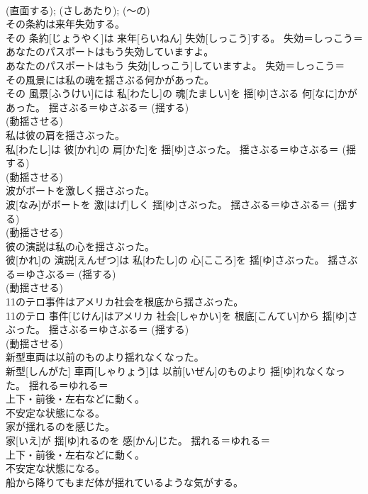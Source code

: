 \documentclass[8pt]{extreport}
\begin{document}
\begin{CJK}{UTF8}{min}
{\\	(直面する); (さしあたり); (〜の) 
\\	その条約は来年失効する。	
\\	その 条約[じょうやく]は 来年[らいねん] 失効[しっこう]する。	失効＝しっこう＝ 
\\	あなたのパスポートはもう失効していますよ。	
\\	あなたのパスポートはもう 失効[しっこう]していますよ。	失効＝しっこう＝ 
\\	その風景には私の魂を揺さぶる何かがあった。	
\\	その 風景[ふうけい]には 私[わたし]の 魂[たましい]を 揺[ゆ]さぶる 何[なに]かがあった。	揺さぶる＝ゆさぶる＝ (揺する) 
\\	(動揺させる) 
\\	私は彼の肩を揺さぶった。	
\\	私[わたし]は 彼[かれ]の 肩[かた]を 揺[ゆ]さぶった。	揺さぶる＝ゆさぶる＝ (揺する) 
\\	(動揺させる) 
\\	波がボートを激しく揺さぶった。	
\\	波[なみ]がボートを 激[はげ]しく 揺[ゆ]さぶった。	揺さぶる＝ゆさぶる＝ (揺する) 
\\	(動揺させる) 
\\	彼の演説は私の心を揺さぶった。	
\\	彼[かれ]の 演説[えんぜつ]は 私[わたし]の 心[こころ]を 揺[ゆ]さぶった。	揺さぶる＝ゆさぶる＝ (揺する) 
\\	(動揺させる) 
\\	11のテロ事件はアメリカ社会を根底から揺さぶった。	
\\	11のテロ 事件[じけん]はアメリカ 社会[しゃかい]を 根底[こんてい]から 揺[ゆ]さぶった。	揺さぶる＝ゆさぶる＝ (揺する) 
\\	(動揺させる) 
\\	新型車両は以前のものより揺れなくなった。	
\\	新型[しんがた] 車両[しゃりょう]は 以前[いぜん]のものより 揺[ゆ]れなくなった。	揺れる＝ゆれる＝　
\\	上下・前後・左右などに動く。 
\\	不安定な状態になる。
\\	家が揺れるのを感じた。	
\\	家[いえ]が 揺[ゆ]れるのを 感[かん]じた。	揺れる＝ゆれる＝　
\\	上下・前後・左右などに動く。 
\\	不安定な状態になる。
\\	船から降りてもまだ体が揺れているような気がする。	
}
\end{CJK}
\end{document}

